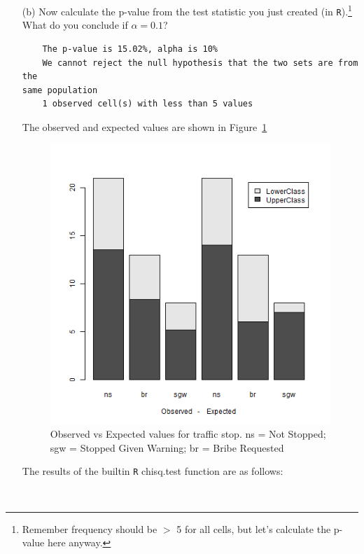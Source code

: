 \documentclass[12pt,letterpaper]{article}
\begin{document}
\begin{enumerate}
	\item [(b)]
	Now calculate the p-value from the test statistic you just created (in \texttt{R}).\footnote{Remember frequency should be $>$ 5 for all cells, but let's calculate the p-value here anyway.}  What do you conclude if $\alpha = 0.1$?\\
	
	
	  
	
	\begin{verbatim}
	The p-value is 15.02%, alpha is 10%
	We cannot reject the null hypothesis that the two sets are from the
same population
	1 observed cell(s) with less than 5 values
	\end{verbatim}

  The observed and expected values are shown in Figure~\ref{fig:obs_exp}	
	\begin{figure}
		  \includegraphics{obs_exp.png}
		  \caption{Observed vs Expected values for traffic stop. ns = Not Stopped; sgw = Stopped Given Warning; br = Bribe Requested}\label{fig:obs_exp}
	\end{figure}

  The results of the builtin \texttt{R} chisq.test function are as follows:
  \begin{verbatim}
  

\end{verbatim}
\end{enumerate}
\end{document}
